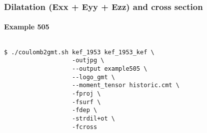 \begin{frame}[t,fragile]
  \frametitle{Dilatation (Exx + Eyy + Ezz) and cross section}
  \framesubtitle{Example 505}
  \label{ch5fr:ex505}
\begin{columns}[t]
  \begin{column}{.5\textwidth}
\begin{scriptsize}
\begin{verbatim}
$ ./coulomb2gmt.sh kef_1953 kef_1953_kef \
                   -outjpg \ 
                   --output example505 \
                   --logo_gmt \
                   --moment_tensor historic.cmt \
                   -fproj \
                   -fsurf \
                   -fdep \
                   -strdil+ot \
                   -fcross
\end{verbatim}
\end{scriptsize}

  \end{column}
  \begin{column}{.5\textwidth}

\centering
  \end{column}
\end{columns}

\end{frame}
\note{}




















